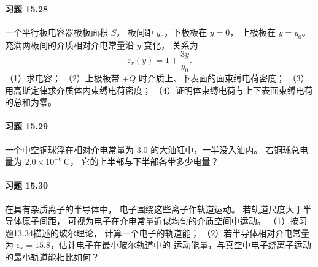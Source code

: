 \paragraph{习题 15.28}
一个平行板电容器极板面积 \(S\)，
板间距 \(y_0\)，下极板在 \(y=0\)，
上极板在 \(y=y_0\)。
充满两板间的介质相对介电常量沿 \(y\) 变化，
关系为
\[
 \varepsilon_r(y)=1+\frac{3y}{y_0}.
\]
（1）求电容；
（2）上极板带 \(+Q\) 时介质上、下表面的面束缚电荷密度；
（3）用高斯定律求介质体内束缚电荷密度；
（4）证明体束缚电荷与上下表面束缚电荷的总和为零。

\paragraph{习题 15.29}
一个中空铜球浮在相对介电常量为
\(3.0\) 的大油缸中，一半没入油内。
若铜球总电量为
\(2.0\times10^{-6}\,\mathrm C\)，
它的上半部与下半部各带多少电量？

\paragraph{习题 15.30}
在具有杂质离子的半导体中，
电子围绕这些离子作轨道运动。
若轨道尺度大于半导体原子间距，
可视为电子在介电常量近似均匀的介质空间中运动。
（1）按习题13.34描述的玻尔理论，
计算一个电子的轨道能；
（2）若半导体相对介电常量为
\(\varepsilon_r=15.8\)，估计电子在最小玻尔轨道中的
运动能量，与真空中电子绕离子运动的最小轨道能相比如何？
